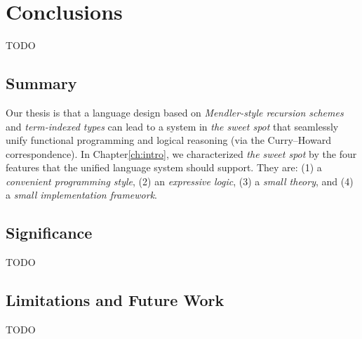 \chapter{Conclusions}\label{ch:concl} TODO

\section{Summary}
Our thesis is that a language design based on
\emph{Mendler-style recursion schemes} and \emph{term-indexed types}
can lead to a system in \emph{the sweet spot} that seamlessly unify
functional programming and logical reasoning
(via the Curry--Howard correspondence).
In Chapter\ref{ch:intro}, we characterized \emph{the sweet spot} by
the four features that the unified language system should support.
They are: (1) a \emph{convenient programming style},
(2) an \emph{expressive logic}, (3) a \emph{small theory}, and
(4) a \emph{small implementation framework}.

\section{Significance}
TODO

\section{Limitations and Future Work}\label{sec:concl:fw}
TODO
